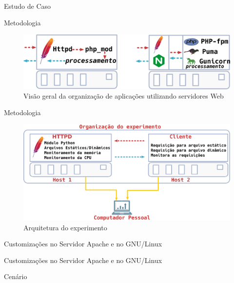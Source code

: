 \documentclass[xcolor={usenames,svgnames,dvipsnames},brazil,english,12pt,aspectratio=149]{beamer}
\begin{document}
\begin{frame}{Estudo de Caso}
\end{frame}

\begin{frame}{Metodologia}
	\begin{figure}[!h] \centering
		\includegraphics[width=.60\textwidth]{web_server_organization_strategy}
		\caption{Visão geral da organização de aplicações utilizando servidores Web}
	\label{fig:web_server} \end{figure}
\end{frame}

\begin{frame}{Metodologia}
	\begin{figure}[!h] \centering
		\includegraphics[width=.90\textwidth]{experiment_arhitecture}
		\caption{Arquitetura do experimento} \label{fig:experiment_architecture}
	\end{figure}
\end{frame}

\begin{frame}{Customizações no Servidor Apache e no GNU/Linux}
	
\end{frame}

\begin{frame}{Customizações no Servidor Apache e no GNU/Linux}
	
\end{frame}

\begin{frame}{Cenário}
	
\end{frame}
\end{document}
